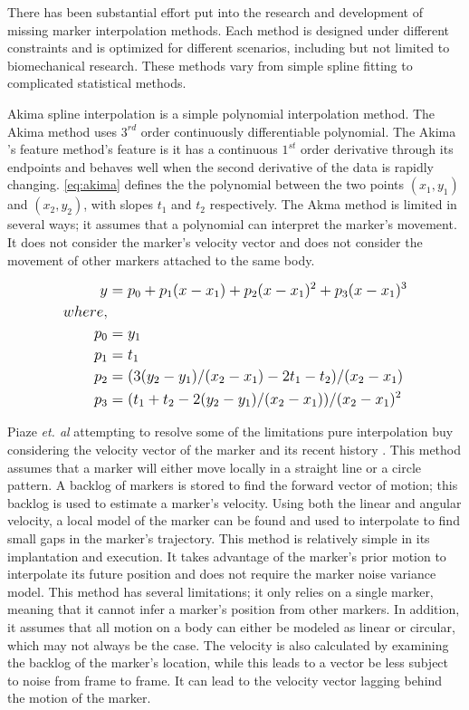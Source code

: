 There has been substantial effort put into the research and development of missing marker interpolation methods. Each method is designed under different constraints and is optimized for different scenarios, including but not limited to biomechanical research. These methods vary from simple spline fitting to complicated statistical methods. 

Akima spline interpolation \cite{wang2014real} is a simple polynomial interpolation method. The Akima method uses $3^{rd}$ order continuously differentiable polynomial. The Akima 's feature method's feature is it has a continuous $1^{st}$  order derivative through its endpoints and behaves well when the second derivative of the data is rapidly changing. \autoref{eq:akima} defines the the polynomial between the two points $(x_{1}, y_{1})$ and $(x_{2}, y_{2})$, with slopes $t_{1}$ and $t_{2}$ respectively. The Akma method is limited in several ways; it assumes that a polynomial can interpret the marker's movement. It does not consider the marker's velocity vector and does not consider the movement of other markers attached to the same body. 

\begin{equation} \label{eq:akima}
\large
\begin{split}
        y &= p_{0} + p_{1}(x - x_{1}) + p_{2}(x - x_{1})^{2} + p_{3}(x - x_{1})^{3} \\
        where, \\
          p_{0} &= y_{1} \\
    p_{1} &= t_{1} \\
    p_{2} &= (3(y_{2} - y_{1})/(x_{2} - x_{1}) - 2t_{1} - t_{2})/(x_{2} - x_{1}) \\
    p_{3} &= (t_{1} + t_{2} - 2(y_{2} - y_{1})/(x_{2} - x_{1}))/(x_{2} - x_{1})^{2}
\end{split}
\end{equation}

Piaze \textit{et. al} attempting to resolve some of the limitations pure interpolation buy considering the velocity vector of the marker and its recent history \cite{piazza2009towards}. This method assumes that a marker will either move locally in a straight line or a circle pattern. A backlog of markers is stored to find the forward vector of motion; this backlog is used to estimate a marker's velocity. Using both the linear and angular velocity, a local model of the marker can be found and used to interpolate to find small gaps in the marker's trajectory. This method is relatively simple in its implantation and execution. It takes advantage of the marker's prior motion to interpolate its future position and does not require the marker noise variance model. This method has several limitations; it only relies on a single marker, meaning that it cannot infer a marker's position from other markers. In addition, it assumes that all motion on a body can either be modeled as linear or circular, which may not always be the case. The velocity is also calculated by examining the backlog of the marker's location, while this leads to a vector be less subject to noise from frame to frame. It can lead to the velocity vector lagging behind the motion of the marker. 

